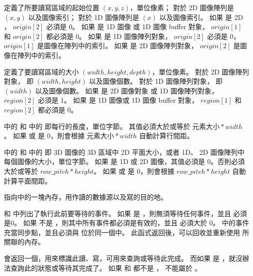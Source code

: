  定義了所要讀寫區域的起始位置 $(x, y, z)$，單位像素；
對於 2D 圖像陣列是 $(x, y)$ 以及圖像索引；
對於 1D 圖像陣列是 $(x)$ 以及圖像索引。
如果  是 2D ， $origin[2]$ 必須是 0。
如果  是 1D 圖像 或 1D 圖像 buffer 對象， $origin[1]$ 和 $origin[2]$ 都必須是 0。
如果  是 1D 圖像陣列對象， $origin[2]$ 必須是 0， $origin[1]$ 是圖像在陣列中的索引。
如果  是 2D 圖像陣列對象， $origin[2]$ 是圖像在陣列中的索引。

 定義了要讀寫區域的大小 $(width, height, depth)$，單位像素。
對於 2D 圖像陣列對象， 即 $(width, height)$ 以及圖像個數。
對於 1D 圖像陣列對象， 即 $(width)$ 以及圖像個數。
如果  是 2D 圖像對象 或 1D 圖像陣列對象， $region[2]$ 必須是 1。
如果  是 1D 圖像或 1D 圖像 buffer 對象， $region[1]$ 和 $region[2]$ 都必須是 0。

 中的  和  中的  即每行的長度，單位字節。
其值必須大於或等於 $元素大小 * width$。
如果  或  是 0，則會根據 $元素大小 * width$ 自動計算行間距。

 中的  和  中的  
即 3D 圖像的 3D 區域中 2D 平面大小，或者 1D、 2D 圖像陣列中每個圖像的大小，單位字節。
如果  是 1D 或 2D 圖像，其值必須是 0。否則必須大於或等於 $row\_pitch * height$。
如果  或  是 0，則會根據 $row\_pitch * height$ 自動計算平面間距。

 指向中的一塊內存，用作讀的數據源以及寫的目的地。

 和  中列出了執行此前要等待的事件。
如果  是 ，則無須等待任何事件，並且  必須是0。
如果  不是 ，則其中所有事件都必須是有效的，並且  必須大於 0。
 中的事件充當同步點，並且必須與  位於同一個中。
此函式返回後，可以回收並重新使用  所關聯的內存。

 會返回一個，用來標識此讀、寫，可用來查詢或等待此完成。
而如果  是 ，就沒辦法查詢此的狀態或等待其完成了。
如果  和  都不是 ，  不能屬於 。

